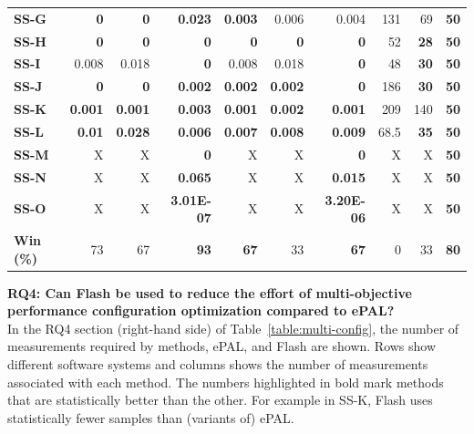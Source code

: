 \documentclass[10pt,journal,compsoc]{IEEEtran}
\newcounter{highlight}[page]
\newcommand{\flash}{{\sc Flash}\xspace}
\begin{document}
\begin{table}[]
\begin{tabular}{@{}lrrrrrrrrr@{}}
\textbf{SS-G} & \textbf{0} & \textbf{0} & \textbf{0.023} & \textbf{0.003} & 0.006 & 0.004 & 131 & 69 & \textbf{50} \\
\textbf{SS-H} & \textbf{0} & \textbf{0} & \textbf{0} & \textbf{0} & \textbf{0} & \textbf{0} & 52 & \textbf{28} & \textbf{50} \\
\textbf{SS-I} & 0.008 & 0.018 & \textbf{0} & 0.008 & 0.018 & \textbf{0} & 48 & \textbf{30} & \textbf{50} \\
\textbf{SS-J} & \textbf{0} & \textbf{0} & \textbf{0.002} & \textbf{0.002} & \textbf{0.002} & \textbf{0} & 186 & \textbf{30} & \textbf{50} \\
\textbf{SS-K} & \textbf{0.001} & \textbf{0.001} & \textbf{0.003} & \textbf{0.001} & \textbf{0.002} & \textbf{0.001} & 209 & 140 & \textbf{50} \\
\textbf{SS-L} & \textbf{0.01} & \textbf{0.028} & \textbf{0.006} & \textbf{0.007} & \textbf{0.008} & \textbf{0.009} & 68.5 & \textbf{35} & \textbf{50} \\
\textbf{SS-M} & X & X & \textbf{0} & X & X & \textbf{0} & X & X & \textbf{50} \\
\textbf{SS-N} & X & X & \textbf{0.065} & X & X & \textbf{0.015} & X & X & \textbf{50} \\
\textbf{SS-O} & X & X & \textbf{3.01E-07} & X & X & \textbf{3.20E-06} & X & X & \textbf{50} \\ \midrule
\textbf{Win (\%)} & 73 & 67 & \textbf{93} & \textbf{67} & 33 & \textbf{67} & 0 & 33 & \textbf{80} \\ \bottomrule
\end{tabular}

\end{table}

\noindent\textbf{RQ4: Can \flash be used to reduce the effort of multi-objective performance configuration optimization compared to ePAL?}\\
In the RQ4 section (right-hand side) of Table~\ref{table:multi-config}, the number of measurements required by methods, ePAL, and \flash are shown. Rows show different software systems and columns shows the number of measurements associated with each method. The numbers highlighted in bold mark methods that are statistically better than the other. For example in SS-K, \flash uses statistically fewer samples than (variants of) ePAL. 
\end{document}
